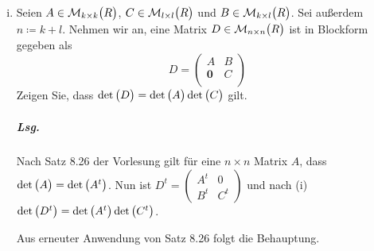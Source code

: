 \documentclass{scrreprt}
\begin{document}
\begin{enumerate}[(i)]
\item Seien $A \in \mathcal{M}_{k \times k}\qty\big(R)$,
  $C \in \mathcal{M}_{l \times l}\qty\big(R)$ und
  $B \in \mathcal{M}_{k \times l}\qty\big(R)$.
  Sei außerdem $n \coloneqq k + l$.
  Nehmen wir an, eine Matrix $D \in \mathcal{M}_{n \times n}\qty\big(R)$
  ist in Blockform gegeben als
  \[
    D = \begin{pmatrix}
      A & B \\
      \textbf{0} & C \\
    \end{pmatrix}
  \]
  Zeigen Sie, dass $\det\qty\big(D) = \det\qty\big(A)\det\qty\big(C)$ gilt.

  \subparagraph{Lsg.} Nach Satz 8.26 der Vorlesung gilt für eine $n \times n$
  Matrix $A$, dass $\det\qty\big(A) = \det\qty\big(A^t)$.
  Nun ist $D^t = \begin{pmatrix}A^t & 0 \\ B^t & C^t\end{pmatrix}$ und
  nach (i) $\det\qty\big(D^t) = \det\qty\big(A^t)\det\qty\big(C^t)$.

  Aus erneuter Anwendung von Satz 8.26 folgt die Behauptung.
\end{enumerate}
\end{document}
